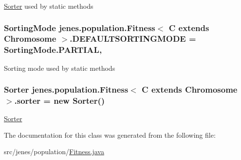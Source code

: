 \hyperlink{classjenes_1_1population_1_1_fitness_3_01_c_01extends_01_chromosome_01_4_1_1_sorter}{Sorter} used by static methods \hypertarget{classjenes_1_1population_1_1_fitness_3_01_c_01extends_01_chromosome_01_4_a314a7dbf1f6c36bc914845a20c370f82}{
\subsubsection[{D\-E\-F\-A\-U\-L\-T\-S\-O\-R\-T\-I\-N\-G\-M\-O\-D\-E}]{\setlength{\rightskip}{0pt plus 5cm}Sorting\-Mode jenes.\-population.\-Fitness$<$ C extends Chromosome $>$.D\-E\-F\-A\-U\-L\-T\-S\-O\-R\-T\-I\-N\-G\-M\-O\-D\-E = {\bf Sorting\-Mode.\-P\-A\-R\-T\-I\-A\-L}\hspace{0.3cm}{\ttfamily [static]}, {\ttfamily [private]}}}\label{classjenes_1_1population_1_1_fitness_3_01_c_01extends_01_chromosome_01_4_a314a7dbf1f6c36bc914845a20c370f82}
Sorting mode used by static methods \hypertarget{classjenes_1_1population_1_1_fitness_3_01_c_01extends_01_chromosome_01_4_abdfac597ad9740bcbbf1ec05ea42c246}{
\subsubsection[{sorter}]{\setlength{\rightskip}{0pt plus 5cm}Sorter jenes.\-population.\-Fitness$<$ C extends Chromosome $>$.sorter = new Sorter()\hspace{0.3cm}{\ttfamily [private]}}}\label{classjenes_1_1population_1_1_fitness_3_01_c_01extends_01_chromosome_01_4_abdfac597ad9740bcbbf1ec05ea42c246}
\hyperlink{classjenes_1_1population_1_1_fitness_3_01_c_01extends_01_chromosome_01_4_1_1_sorter}{Sorter} 

The documentation for this class was generated from the following file\-:\begin{DoxyCompactItemize}
\item 
src/jenes/population/\hyperlink{_fitness_8java}{Fitness.\-java}\end{DoxyCompactItemize}
